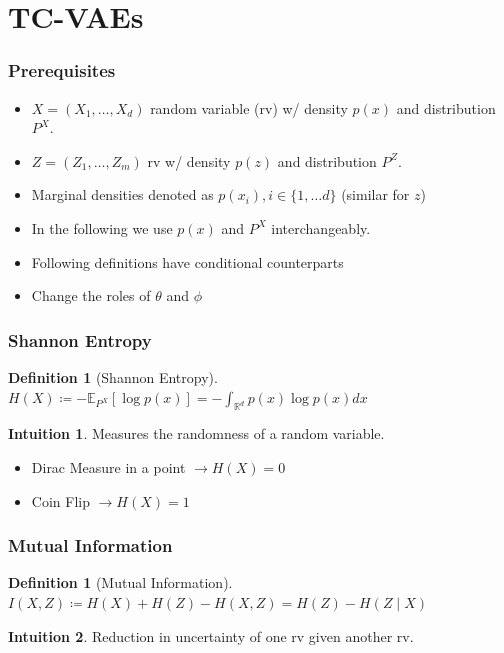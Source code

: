 \documentclass{beamer}
\newcommand{\R}{\mathbb{R}}
\theoremstyle{definition}
\newtheorem{definition}[section]{Definition}
\newtheorem{intuition}{Intuition}
\begin{document}
    \section{TC-VAEs}
    \begin{frame}
      \frametitle{Prerequisites}
      \begin{itemize}
        \item $X = (X_{1}, \dots, X_{d})$ random variable (rv) w/ density $p(x)$ and distribution $P^{X}$.
        \item $Z = (Z_{1}, \dots, Z_{m})$ rv w/ density $p(z)$ and distribution $P^{Z}$.
              \item Marginal densities denoted as $p(x_{i}), i \in \{1, \dots d\}$ (similar for $z$)
        \item In the following we use $p(x)$ and $P^{X}$  interchangeably.
        \item Following definitions have conditional counterparts
        \item Change the roles of $\theta$ and $\phi$
      \end{itemize}
    \end{frame}

    \begin{frame}
      \frametitle{Shannon Entropy}
      \begin{definition}[Shannon Entropy]
        $H(X) \coloneqq -\mathbb{E}_{P^{X}}[\log p(x)] = -\int_{\R^{d}}p(x) \log p(x) dx$
      \end{definition}
      \begin{intuition}
       Measures the randomness of a random variable.
     \end{intuition}
     \begin{example}
       \begin{itemize}
         \item Dirac Measure in a point $\rightarrow H(X) = 0$
               \item Coin Flip $\rightarrow H(X) = 1$
       \end{itemize}
     \end{example}
    \end{frame}

    \begin{frame}
      \frametitle{Mutual Information}
      \begin{definition}[Mutual Information]
        $I(X, Z) \coloneqq H(X) + H(Z) - H(X, Z) = H(Z) - H(Z \mid X)$
      \end{definition}
      \begin{intuition}
        Reduction in uncertainty of one rv given another rv.
      \end{intuition}
    \end{frame}
\end{document}
